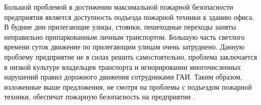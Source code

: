 Большой проблемой в достижении максимальной пожарной безопасности предприятия является доступность подъезда пожарной техники к зданию офиса.
В будние дни прилегающие улицы, стоянки, пешеходные переходы заняты неправильно припаркованным личным транспортом.
Большую часть светлого времени суток движение по прилегающим улицам очень затруднено.
Данную проблему предприятие не в силах решить самостоятельно, проблема заключается в низкой культуре владельцев транспорта и игнорировании многочисленных нарушений правил дорожного движения  сотрудниками ГАИ.
Таким образом, изложенные выше предложения, не смотря на проблемы с подъездом пожарной техники, обеспечат пожарную безопасность на предприятии \companyname{}.
